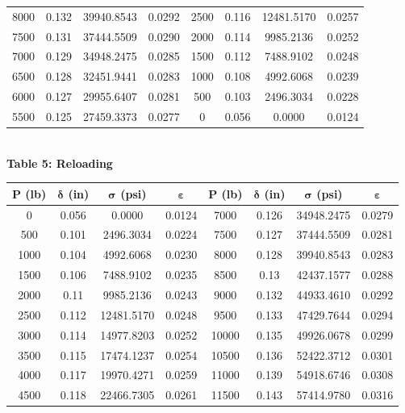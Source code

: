\documentclass{article}
\begin{document}
\begin{center}
\begin{tabular}{|c c c c||c c c c|}
        8000 & 0.132 & 39940.8543 & 0.0292 &2500 & 0.116 & 12481.5170 & 0.0257 \\
        7500 & 0.131 & 37444.5509 & 0.0290 &2000 & 0.114 & 9985.2136 & 0.0252 \\ 
        7000 & 0.129 & 34948.2475 & 0.0285 &1500 & 0.112 & 7488.9102 & 0.0248 \\
        6500 & 0.128 & 32451.9441 & 0.0283 &1000 & 0.108 & 4992.6068 & 0.0239 \\ 
        6000 & 0.127 & 29955.6407 & 0.0281 &500 & 0.103 & 2496.3034 & 0.0228 \\ 
        5500 & 0.125 & 27459.3373 & 0.0277 &0 & 0.056 & 0.0000 & 0.0124 \\ \hline        
    \end{tabular}
    \vspace{5 mm}
    {\large{\bf \\Table 5: Reloading\\}}
    \vspace{3mm}
    \begin{tabular}{|c c c c || c c c c|}
        \hline
        \textbf{P (lb)} & \(\bm{\delta}\)\textbf{ (in)} & \(\bm{\sigma}\)\textbf{ (psi)} & \(\bm{\varepsilon}\) & \textbf{P (lb)} & \(\bm{\delta}\)\textbf{ (in)} & \(\bm{\sigma}\)\textbf{ (psi)} & \(\bm{\varepsilon}\) \\ \hline
        0 & 0.056 & 0.0000 & 0.0124 &7000 & 0.126 & 34948.2475 & 0.0279 \\ 
        500 & 0.101 & 2496.3034 & 0.0224 &7500 & 0.127 & 37444.5509 & 0.0281 \\ 
        1000 & 0.104 & 4992.6068 & 0.0230 &8000 & 0.128 & 39940.8543 & 0.0283 \\ 
        1500 & 0.106 & 7488.9102 & 0.0235 &8500 & 0.13 & 42437.1577 & 0.0288 \\ 
        2000 & 0.11 & 9985.2136 & 0.0243 &9000 & 0.132 & 44933.4610 & 0.0292 \\ 
        2500 & 0.112 & 12481.5170 & 0.0248 &9500 & 0.133 & 47429.7644 & 0.0294 \\ 
        3000 & 0.114 & 14977.8203 & 0.0252 &10000 & 0.135 & 49926.0678 & 0.0299 \\ 
        3500 & 0.115 & 17474.1237 & 0.0254 &10500 & 0.136 & 52422.3712 & 0.0301 \\ 
        4000 & 0.117 & 19970.4271 & 0.0259 &11000 & 0.139 & 54918.6746 & 0.0308 \\ 
        4500 & 0.118 & 22466.7305 & 0.0261 &11500 & 0.143 & 57414.9780 & 0.0316 \\ 

\end{tabular}
\end{center}
\end{document}
